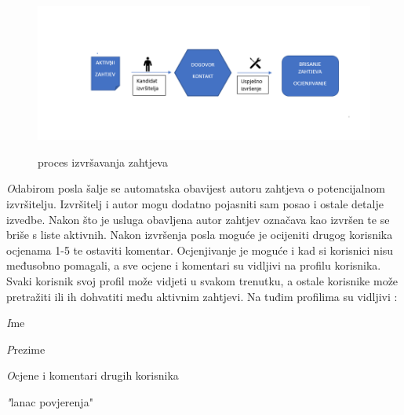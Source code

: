 		\begin{figure}[H]
			\includegraphics[scale=0.7]{slike/projekt2.png} %
			\centering
			\caption \newline proces izvršavanja zahtjeva
			\label{fig:promjene}
		\end{figure}

        \textit Odabirom posla šalje se automatska obavijest autoru zahtjeva o potencijalnom izvršitelju. Izvršitelj i autor mogu dodatno pojasniti sam posao i ostale detalje izvedbe. Nakon što je usluga obavljena autor zahtjev označava kao izvršen te se briše s liste aktivnih.  
        \newline
Nakon izvršenja posla moguće je ocijeniti drugog korisnika ocjenama 1-5 te ostaviti komentar. Ocjenjivanje je moguće i kad si korisnici nisu međusobno pomagali, a sve ocjene i komentari su vidljivi na profilu korisnika.
        \newline
Svaki korisnik svoj profil može vidjeti u svakom trenutku, a ostale korisnike može pretražiti ili ih dohvatiti među aktivnim zahtjevi. Na tuđim profilima su vidljivi :
		
		\begin{packed_item}
			\item \textit Ime
			\item \textit Prezime
			\item \textit Ocjene i komentari drugih korisnika
			\item \textit "lanac povjerenja"

		\end{packed_item}
		
